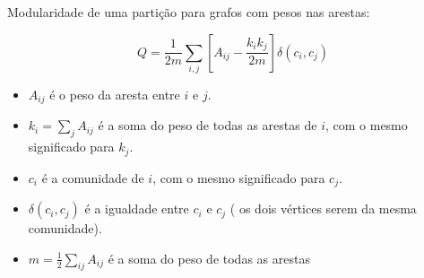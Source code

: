 Modularidade de uma partição para grafos com pesos nas arestas:

\begin{equation}
Q = \frac{1}{2m} \sum_{i,j} [ A_{ij} - \frac{k_i k_j}{2m} ] \delta(c_i ,c_j)
\label{eq:MN}
\end{equation}


\begin{itemize}
	\item $A_{ij}$ é o peso da aresta entre $i$ e $j$.
	\item $k_i = \sum_j A_{ij}$ é a soma do peso de todas as arestas de $i$, com o mesmo significado para $k_j$.
	\item $c_i$ é a comunidade de $i$, com o mesmo significado para $c_j$.
	\item $\delta(c_i,c_j)$ é a igualdade entre $c_i$ e $c_j$ ( os dois vértices serem da mesma comunidade).
	\item $m = \frac{1}{2}\sum_{ij} A_{ij}$ é a soma do peso de todas as arestas %
\end{itemize}


